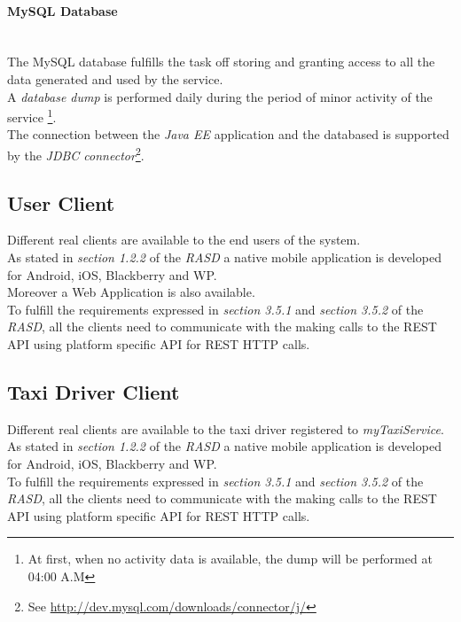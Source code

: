 \paragraph{MySQL Database} %
\label{par:mysql_database}\hfill \\
The MySQL database fulfills the task off storing and granting access to all the data generated and used by the service.\\
A \emph{database dump} is performed daily during the period of minor activity of the service \footnote{At first, when no activity data is available, the dump will be performed at 04:00 A.M}.\\
The connection between the \emph{Java EE} application and the databased is supported by the \emph{JDBC connector}\footnote{See \url{http://dev.mysql.com/downloads/connector/j/}}.\\


\subsection{User Client} %
\label{sub:user_client}
Different real clients are available to the end users of the system.\\
As stated in \emph{section 1.2.2} of the \emph{RASD} a native mobile application is developed for Android, iOS, Blackberry and WP.\\
Moreover a Web Application is also available.\\
To fulfill the requirements expressed in \emph{section 3.5.1} and \emph{section 3.5.2} of the \emph{RASD}, all the clients need to communicate with the  making calls to the REST API using platform specific API for REST HTTP calls.


\subsection{Taxi Driver Client} %
\label{sub:taxi_driver_client}
Different real clients are available to the taxi driver registered to \emph{myTaxiService}.\\
As stated in \emph{section 1.2.2} of the \emph{RASD} a native mobile application is developed for Android, iOS, Blackberry and WP.\\
To fulfill the requirements expressed in \emph{section 3.5.1} and \emph{section 3.5.2} of the \emph{RASD}, all the clients need to communicate with the  making calls to the REST API using platform specific API for REST HTTP calls.
